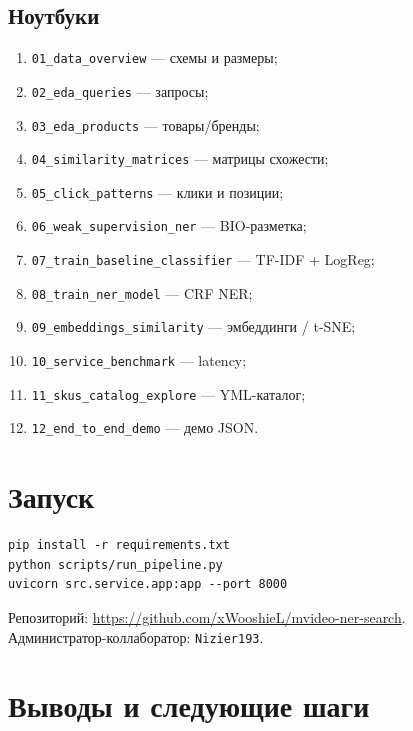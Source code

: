 \documentclass[11pt,a4paper]{article}
\begin{document}
\subsection{Ноутбуки}

\begin{enumerate}
    \item \texttt{01\_data\_overview} --- схемы и размеры;
    \item \texttt{02\_eda\_queries} --- запросы;
    \item \texttt{03\_eda\_products} --- товары/бренды;
    \item \texttt{04\_similarity\_matrices} --- матрицы схожести;
    \item \texttt{05\_click\_patterns} --- клики и позиции;
    \item \texttt{06\_weak\_supervision\_ner} --- BIO-разметка;
    \item \texttt{07\_train\_baseline\_classifier} --- TF-IDF + LogReg;
    \item \texttt{08\_train\_ner\_model} --- CRF NER;
    \item \texttt{09\_embeddings\_similarity} --- эмбеддинги / t-SNE;
    \item \texttt{10\_service\_benchmark} --- latency;
    \item \texttt{11\_skus\_catalog\_explore} --- YML-каталог;
    \item \texttt{12\_end\_to\_end\_demo} --- демо JSON.
\end{enumerate}

\newpage

\section{Запуск}

\begin{summarybox}
\begin{verbatim}
pip install -r requirements.txt
python scripts/run_pipeline.py
uvicorn src.service.app:app --port 8000
\end{verbatim}
\end{summarybox}

\begin{remarkbox}[GitHub]
Репозиторий: \url{https://github.com/xWooshieL/mvideo-ner-search}.\\
Администратор-коллаборатор: \texttt{Nizier193}.
\end{remarkbox}

\section{Выводы и следующие шаги}
\end{document}
